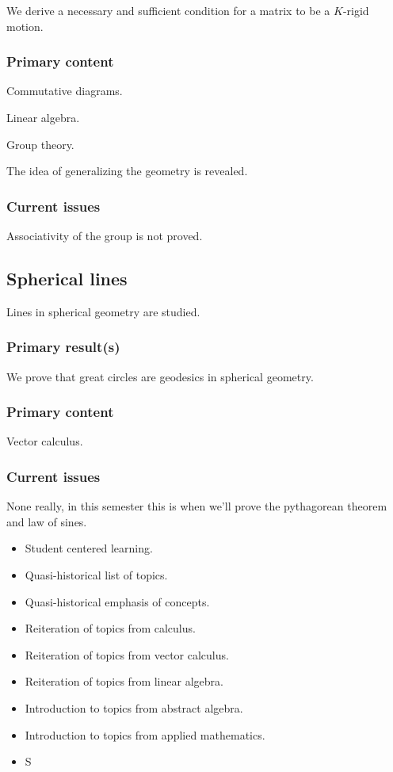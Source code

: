 \documentclass{amsart}
\begin{document}
We derive a necessary and sufficient condition for a matrix to be a
$K$-rigid motion.

\subsubsection{Primary content}

Commutative diagrams.

Linear algebra.

Group theory.

The idea of generalizing the geometry is revealed.


\subsubsection{Current issues}

Associativity of the group is not proved.




\subsection{Spherical lines}

Lines in spherical geometry are studied.

\subsubsection{Primary result(s)}

We prove that great circles are geodesics in spherical geometry.


\subsubsection{Primary content}

Vector calculus.


\subsubsection{Current issues}

None really, in this semester this is when we'll prove the pythagorean
theorem and law of sines.












\begin{itemize}
\item Student centered learning.
\item Quasi-historical list of topics.
\item Quasi-historical emphasis of concepts.
\item Reiteration of topics from calculus.
\item Reiteration of topics from vector calculus.
\item Reiteration of topics from linear algebra.
\item Introduction to topics from abstract algebra.
\item Introduction to topics from applied mathematics.
\item S
\end{itemize}
\end{document}
